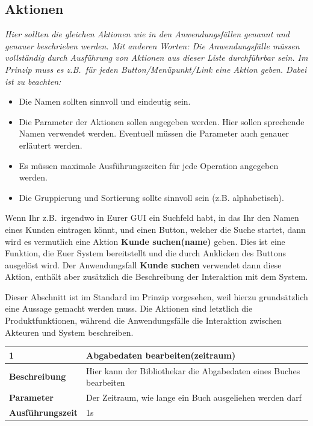 \documentclass[fontsize=12pt,paper=a4,twoside]{scrartcl}
\begin{document}
\subsection{Aktionen}
  {\em Hier sollten die gleichen Aktionen wie in den Anwendungsfällen
  genannt und genauer beschrieben werden. Mit anderen Worten: Die
  Anwendungsfälle müssen vollständig durch Ausführung von Aktionen aus
  dieser Liste durchführbar sein. Im Prinzip muss es z.B.\ für jeden
  Button/Menüpunkt/Link eine Aktion geben. Dabei ist zu beachten:
  \begin{itemize}
    \item Die Namen sollten sinnvoll und eindeutig sein.

    \item Die Parameter der Aktionen sollen angegeben werden. Hier
    sollen sprechende Namen verwendet werden. Eventuell müssen die
    Parameter auch genauer erläutert werden.

    \item Es müssen maximale Ausführungszeiten für jede Operation
    angegeben werden.
    
  \item Die Gruppierung und Sortierung sollte sinnvoll sein
    (z.B. alphabetisch).
  \end{itemize}

  Wenn Ihr z.B.\ irgendwo in Eurer GUI ein Suchfeld habt, in das Ihr
  den Namen eines Kunden eintragen könnt, und einen Button, welcher die
  Suche startet, dann wird es vermutlich eine Aktion {\bf Kunde
    suchen(name)} geben. Dies ist eine Funktion, die Euer System
  bereitstellt und die durch Anklicken des Buttons ausgelöst wird. Der
  Anwendungsfall {\bf Kunde suchen} verwendet dann diese Aktion,
  enthält aber zusätzlich die Beschreibung der Interaktion mit dem
  System.
  
  Dieser Abschnitt ist im Standard im Prinzip vorgesehen, weil hierzu
  grundsätzlich eine Aussage gemacht werden muss. Die Aktionen sind
  letztlich die Produktfunktionen, während die Anwendungsfälle die
  Interaktion zwischen Akteuren und System beschreiben. }

  \begin{table}[htbp]
  \label{a1}
  \begin{tabular}{|l|p{10cm}|}
  \hline 
  \textbf{1} & \textbf{Abgabedaten bearbeiten(zeitraum)} \\ \hline
  \textbf{Beschreibung} & Hier kann der Bibliothekar die Abgabedaten eines Buches bearbeiten\\ \hline
  \textbf{Parameter} & Der Zeitraum, wie lange ein Buch ausgeliehen werden darf\\ \hline
  \textbf{Ausführungszeit} & 1s\\ \hline
  \end{tabular}
  \end{table}
  
\end{document}
